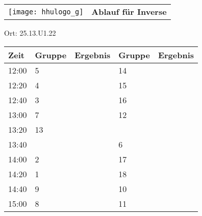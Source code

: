 \documentclass[a4paper,10pt]{article}
\def\spiele{Inverse}
\def\raume{25.13.U1.22}
\begin{document}
  \begin{tabularx}{\textwidth}{lc}
    \texttt{[image: hhulogo\_g]}
  & {\Huge \textbf{Ablauf für \spiele}}
  \end{tabularx}
  \LARGE
  \begin{center}
    \vspace{1cm} 
    Ort: \raume
  \end{center}
    \vspace{2cm} 
    \begin{tabularx}{\textwidth}{X||X|X||X|X}
	\textbf{Zeit} &\textbf{Gruppe} & \textbf{Ergebnis} &\textbf{Gruppe} & \textbf{Ergebnis}  	\\ \hline \hline
	12:00 &	5	&	&14	&	\\ \hline
	12:20 &	4	&	&15	&	\\ \hline
	12:40 &	3	&	&16	&	\\ \hline

	13:00 &	7	&	&12	&	\\ \hline
	13:20 &	13	&	&	&	\\ \hline
	13:40 &		&	&6	&	\\ \hline

	14:00 &	2	&	&17	&	\\ \hline
	14:20 &	1	&	&18	&	\\ \hline
	14:40 &	9	&	&10	&	\\ \hline

	15:00 &	8	&	&11	&	\\ \hline
      
    \end{tabularx}
   
\end{document}
